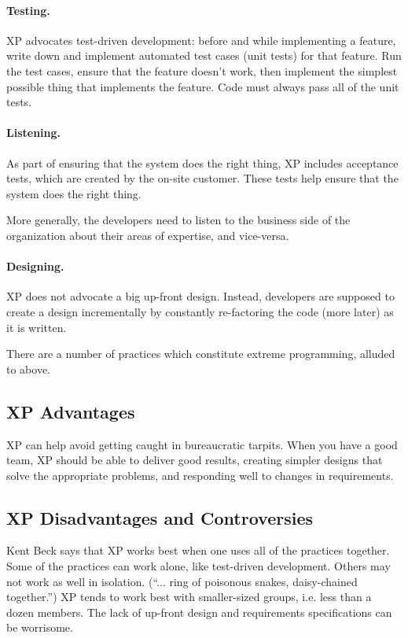 \paragraph{Testing.} XP advocates test-driven development: before
and while implementing a feature, write down and implement automated
test cases (unit tests) for that feature. Run the test cases, ensure
that the feature doesn't work, then implement the simplest possible
thing that implements the feature. Code must always pass all of the
unit tests.

\paragraph{Listening.} As part of ensuring that the system does the
right thing, XP includes acceptance tests, which are created by the
on-site customer. These tests help ensure that the system does the
right thing.

More generally, the developers need to listen to the business side
of the organization about their areas of expertise, and vice-versa.

\paragraph{Designing.} XP does not advocate a big up-front design.
Instead, developers are supposed to create a design incrementally by
constantly re-factoring the code (more later) as it is written.

There are a number of practices which constitute extreme
programming, alluded to above.

\subsection*{XP Advantages}
XP can help avoid getting caught in bureaucratic tarpits. When you have 
a good team, XP should be able to deliver good results, creating simpler
designs that solve the appropriate problems, and responding well to changes
in requirements.

\subsection*{XP Disadvantages and Controversies}
Kent Beck says that XP works best when one uses all of the practices
together. Some of the practices can work alone, like test-driven
development. Others may not work as well in 
isolation\cite{srsn}. (``... ring of poisonous snakes, daisy-chained together.'') 
XP tends to work best with smaller-sized groups, i.e. less than a
dozen members.
The lack of up-front design and requirements specifications can be
worrisome.


